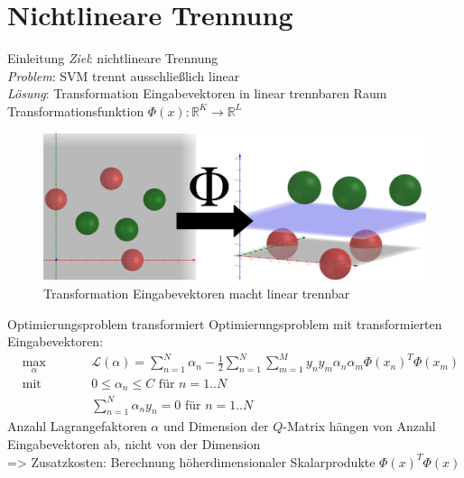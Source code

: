 \documentclass[ngerman]{beamer}
\newcommand{\Lagr}{\mathcal{L}}
\begin{document}
\section{Nichtlineare Trennung}\label{sec:nichtlintrenn}
\begin{frame}{Einleitung}
    \emph{Ziel}: nichtlineare Trennung \\
    \emph{Problem}: SVM trennt ausschließlich linear \\ \pause
    \emph{Lösung}: Transformation Eingabevektoren in linear trennbaren Raum \\
    Transformationsfunktion $\Phi(x): \mathbb{R}^{K} \rightarrow \mathbb{R}^{L}$ \\
    \begin{center}
        \begin{figure}
            \includegraphics[width=\textwidth,height=0.7\textheight,keepaspectratio]{assets/2d_to_3d_phi}
            \caption{Transformation Eingabevektoren macht linear trennbar}
            \label{fig:transmachtlinear}
        \end{figure}
    \end{center}
\end{frame}

\begin{frame}{Optimierungsproblem transformiert}
Optimierungsproblem mit transformierten Eingabevektoren: \\ \pause
\begin{subequations} \label{eq:soft_margin_with_transform_pres}
\begin{alignat*}{2}
    &\!\max_{\alpha}        &\qquad&  	\Lagr(\alpha) = \sum_{n=1}^{N} \alpha_{n} - \frac{1}{2} \sum_{n=1}^{N} \sum_{m=1}^{M} y_{n} y_{m} \alpha_{n} \alpha_{m} \Phi(x_{n})^{T} \Phi(x_{m})\\
    &\text{mit } &      & 0 \leq \alpha_{n} \leq C \text{ für } n=1..N\\
    &       & & \sum_{n=1}^{N} \alpha_{n} y_{n} = 0\text{ für } n=1..N
\end{alignat*}
\end{subequations} \pause
    Anzahl Lagrangefaktoren $\alpha$ und Dimension der $Q$-Matrix hängen von Anzahl Eingabevektoren ab, nicht von der Dimension \\ \pause
    => Zusatzkosten: Berechnung höherdimensionaler Skalarprodukte $\Phi(x)^{T} \Phi(x)$
\end{frame}
\end{document}
